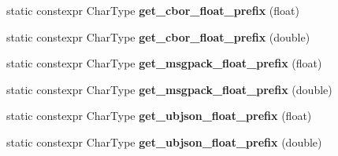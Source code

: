 \begin{DoxyCompactItemize}
\mbox{\label{classnlohmann_1_1detail_1_1binary__writer_a2b5cb010077da6241a18bb334736464c}} 
static constexpr Char\+Type {\bfseries get\+\_\+cbor\+\_\+float\+\_\+prefix} (float)
\item 
\mbox{\label{classnlohmann_1_1detail_1_1binary__writer_afe5ac43e05973ba09ee79227bb589b59}} 
static constexpr Char\+Type {\bfseries get\+\_\+cbor\+\_\+float\+\_\+prefix} (double)
\item 
\mbox{\label{classnlohmann_1_1detail_1_1binary__writer_ad452d114696407b98abc69b6001c270e}} 
static constexpr Char\+Type {\bfseries get\+\_\+msgpack\+\_\+float\+\_\+prefix} (float)
\item 
\mbox{\label{classnlohmann_1_1detail_1_1binary__writer_a47234a6e7ac9206d43553985f4cacbf2}} 
static constexpr Char\+Type {\bfseries get\+\_\+msgpack\+\_\+float\+\_\+prefix} (double)
\item 
\mbox{\label{classnlohmann_1_1detail_1_1binary__writer_a6837b20574152f7f645d0f6cd9fafdeb}} 
static constexpr Char\+Type {\bfseries get\+\_\+ubjson\+\_\+float\+\_\+prefix} (float)
\item 
\mbox{\label{classnlohmann_1_1detail_1_1binary__writer_a19eb47a53dbbe28f319532bef25d84e6}} 
static constexpr Char\+Type {\bfseries get\+\_\+ubjson\+\_\+float\+\_\+prefix} (double)
\end{DoxyCompactItemize}
